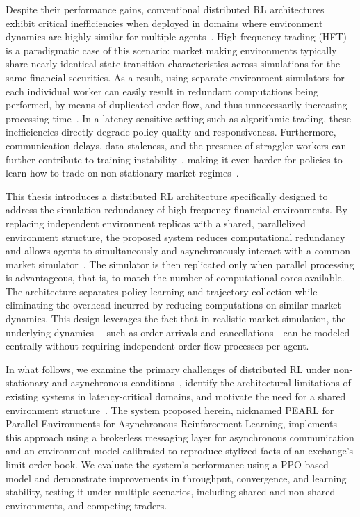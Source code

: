 Despite their performance gains, conventional distributed RL architectures exhibit critical inefficiencies when
deployed in domains where environment dynamics are highly similar for multiple agents~\citep{AlSaffar2023,Lu2024}.
High-frequency trading (HFT) is a paradigmatic case of this scenario: market making environments typically share nearly
identical state transition characteristics across simulations for the same financial securities.
As a result, using separate environment simulators for each individual worker can easily result in redundant computations being performed,
by means of duplicated order flow, and thus unnecessarily increasing processing time~\citep{Hou2025}.
In a latency-sensitive setting such as algorithmic trading, these inefficiencies directly degrade policy quality and responsiveness.
Furthermore, communication delays, data staleness, and the presence of straggler workers can further contribute to training instability~\citep{He2022,Xie2023},
making it even harder for policies to learn how to trade on non-stationary market regimes~\citep{Borzilov2025}.

This thesis introduces a distributed RL architecture specifically designed to address the simulation redundancy of high-frequency financial environments.
By replacing independent environment replicas with a shared, parallelized environment structure,
the proposed system reduces computational redundancy and allows agents to simultaneously and asynchronously interact with a common market simulator~\citep{Yin2024,Hou2025}.
The simulator is then replicated only when parallel processing is advantageous, that is,
to match the number of computational cores available.
The architecture separates policy learning and trajectory collection while eliminating the overhead incurred by reducing computations on similar market dynamics.
This design leverages the fact that in realistic market simulation, the underlying dynamics
---such as order arrivals and cancellations---can be modeled centrally without requiring independent order flow processes per agent.

In what follows, we examine the primary challenges of distributed RL under non-stationary and asynchronous conditions~\citep{Huh2023},
identify the architectural limitations of existing systems in latency-critical domains, and motivate the need for a shared environment structure~\citep{Cho2023,Furukawa2022}.
The system proposed herein, nicknamed PEARL for Parallel Environments for Asynchronous Reinforcement Learning,
implements this approach using a brokerless messaging layer for asynchronous communication and an environment model
calibrated to reproduce stylized facts of an exchange's limit order book.
We evaluate the system's performance using a PPO-based model and demonstrate improvements in
throughput, convergence, and learning stability, testing it under multiple scenarios, including shared and non-shared environments, and competing traders.


